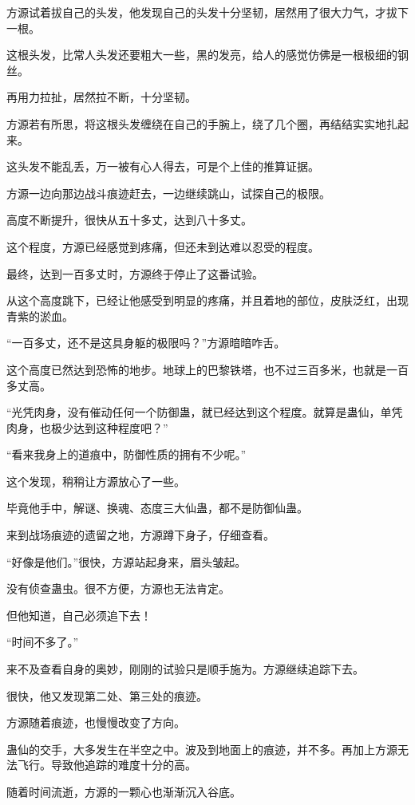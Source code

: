 \begin{this_body}
方源试着拔自己的头发，他发现自己的头发十分坚韧，居然用了很大力气，才拔下一根。

这根头发，比常人头发还要粗大一些，黑的发亮，给人的感觉仿佛是一根极细的钢丝。

再用力拉扯，居然拉不断，十分坚韧。

方源若有所思，将这根头发缠绕在自己的手腕上，绕了几个圈，再结结实实地扎起来。

这头发不能乱丢，万一被有心人得去，可是个上佳的推算证据。

方源一边向那边战斗痕迹赶去，一边继续跳山，试探自己的极限。

高度不断提升，很快从五十多丈，达到八十多丈。

这个程度，方源已经感觉到疼痛，但还未到达难以忍受的程度。

最终，达到一百多丈时，方源终于停止了这番试验。

从这个高度跳下，已经让他感受到明显的疼痛，并且着地的部位，皮肤泛红，出现青紫的淤血。

“一百多丈，还不是这具身躯的极限吗？”方源暗暗咋舌。

这个高度已然达到恐怖的地步。地球上的巴黎铁塔，也不过三百多米，也就是一百多丈高。

“光凭肉身，没有催动任何一个防御蛊，就已经达到这个程度。就算是蛊仙，单凭肉身，也极少达到这种程度吧？”

“看来我身上的道痕中，防御性质的拥有不少呢。”

这个发现，稍稍让方源放心了一些。

毕竟他手中，解谜、换魂、态度三大仙蛊，都不是防御仙蛊。

来到战场痕迹的遗留之地，方源蹲下身子，仔细查看。

“好像是他们。”很快，方源站起身来，眉头皱起。

没有侦查蛊虫。很不方便，方源也无法肯定。

但他知道，自己必须追下去！

“时间不多了。”

来不及查看自身的奥妙，刚刚的试验只是顺手施为。方源继续追踪下去。

很快，他又发现第二处、第三处的痕迹。

方源随着痕迹，也慢慢改变了方向。

蛊仙的交手，大多发生在半空之中。波及到地面上的痕迹，并不多。再加上方源无法飞行。导致他追踪的难度十分的高。

随着时间流逝，方源的一颗心也渐渐沉入谷底。


\end{this_body}
